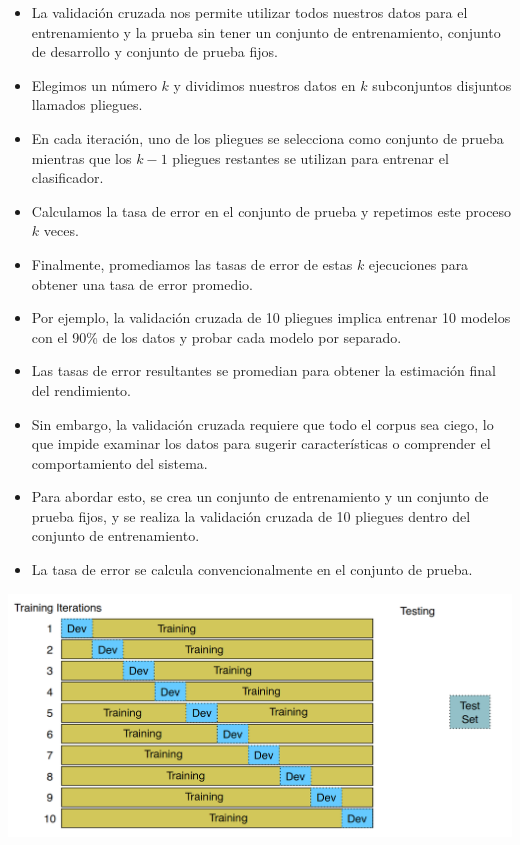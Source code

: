 \begin{itemize}
\item La validación cruzada nos permite utilizar todos nuestros datos para el entrenamiento y la prueba sin tener un conjunto de entrenamiento, conjunto de desarrollo y conjunto de prueba fijos.
\item Elegimos un número $k$ y dividimos nuestros datos en $k$ subconjuntos disjuntos llamados pliegues.
\item En cada iteración, uno de los pliegues se selecciona como conjunto de prueba mientras que los $k-1$ pliegues restantes se utilizan para entrenar el clasificador.
\item Calculamos la tasa de error en el conjunto de prueba y repetimos este proceso $k$ veces.
\item Finalmente, promediamos las tasas de error de estas $k$ ejecuciones para obtener una tasa de error promedio.
\item Por ejemplo, la validación cruzada de 10 pliegues implica entrenar 10 modelos con el 90\% de los datos y probar cada modelo por separado.
\item Las tasas de error resultantes se promedian para obtener la estimación final del rendimiento.
\item Sin embargo, la validación cruzada requiere que todo el corpus sea ciego, lo que impide examinar los datos para sugerir características o comprender el comportamiento del sistema.
\item Para abordar esto, se crea un conjunto de entrenamiento y un conjunto de prueba fijos, y se realiza la validación cruzada de 10 pliegues dentro del conjunto de entrenamiento.
\item La tasa de error se calcula convencionalmente en el conjunto de prueba.
\end{itemize}


\begin{center}
\includegraphics[scale=0.28]{pics/cv.png}
\end{center}


